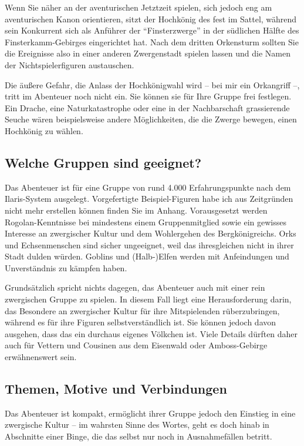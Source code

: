Wenn Sie näher an der aventurischen Jetztzeit spielen, sich jedoch eng am aventurischen Kanon orientieren, sitzt der Hochkönig des \fkvs fest im Sattel,
während sein Konkurrent sich als Anführer der \enquote{Finsterzwerge} in der südlichen Hälfte des Finsterkamm-Gebirges eingerichtet hat.
Nach dem dritten Orkensturm sollten Sie die Ereignisse also in einer anderen Zwergenstadt spielen lassen und die Namen der Nichtspielerfiguren austauschen.

Die äußere Gefahr, die Anlass der Hochkönigwahl wird -- bei mir ein Orkangriff --, tritt im Abenteuer noch nicht ein. Sie können sie für Ihre Gruppe frei festlegen.
Ein Drache, eine Naturkatastrophe oder eine in der Nachbarschaft grassierende Seuche wären beispielsweise andere Möglichkeiten, die die Zwerge bewegen, einen Hochkönig zu wählen.

\subsection{Welche Gruppen sind geeignet?}
Das Abenteuer ist für eine Gruppe von rund 4.000 Erfahrungspunkte nach dem Ilaris-System ausgelegt. Vorgefertigte Beispiel-Figuren habe ich aus Zeitgründen nicht mehr erstellen können finden Sie im Anhang.
Vorausgesetzt werden Rogolan-Kenntnisse bei mindestens einem Gruppenmitglied sowie ein gewisses Interesse an zwergischer Kultur und dem Wohlergehen des Bergkönigreichs.
Orks und Echsenmenschen sind sicher ungeeignet, weil das \fkv ihresgleichen nicht in ihrer Stadt dulden würden.
Goblins und (Halb-)Elfen werden mit Anfeindungen und Unverständnis zu kämpfen haben.

Grundsätzlich spricht nichts dagegen, das Abenteuer auch mit einer rein zwergischen Gruppe zu spielen.
In diesem Fall liegt eine Herausforderung darin,  das Besondere an zwergischer Kultur für ihre Mitspielenden rüberzubringen, während es für ihre Figuren selbstverständlich ist.
Sie können jedoch davon ausgehen, dass das \fkv ein durchaus eigenes Völkchen ist.
Viele Details dürften daher auch für  Vettern und Cousinen aus dem Eisenwald oder Amboss-Gebirge erwähnenswert sein.

\subsection{Themen, Motive und Verbindungen}
Das Abenteuer ist kompakt, ermöglicht  ihrer Gruppe jedoch den Einstieg in eine zwergische Kultur -- im wahrsten Sinne des Wortes, geht es doch hinab in Abschnitte einer Binge,
die das \fkv selbst nur noch in  Ausnahmefällen betritt.



